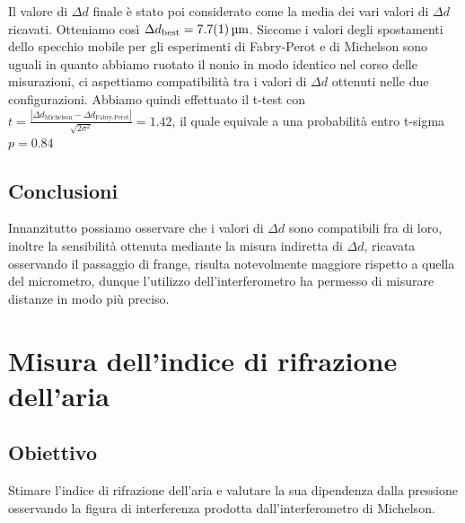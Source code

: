 \documentclass[a4paper]{article}
\begin{document}
Il valore di $\Delta d$ finale è stato poi considerato come la media dei vari valori di $\Delta d$ ricavati. Otteniamo così $\Delta d_{\text{best}}=\SI{7.7 \pm 0.1}{\micro\meter}$.
Siccome i valori degli spostamenti dello specchio mobile per gli esperimenti di Fabry-Perot e di Michelson sono uguali in quanto abbiamo ruotato il nonio in modo identico nel corso delle misurazioni, ci aspettiamo compatibilità tra i valori di $\Delta d$ ottenuti nelle due configurazioni. Abbiamo quindi effettuato il t-test con $t=\frac{|\Delta d_{\text{Michelson}}-\Delta d_{\text{Fabry-Perot}}|}{\sqrt{2\sigma^2}}=\num{1.42}$, il quale equivale a una probabilità entro t-sigma $p=\num{0.84}$
\subsection{Conclusioni}
Innanzitutto possiamo osservare che i valori di $\Delta d$ sono compatibili fra di loro, inoltre la sensibilità ottenuta mediante la misura indiretta di $\Delta d$, ricavata osservando il passaggio di frange, risulta notevolmente maggiore rispetto a quella del micrometro, dunque l'utilizzo dell'interferometro ha permesso di misurare distanze in modo più preciso.

\section{Misura dell'indice di rifrazione dell'aria}
\subsection{Obiettivo}
Stimare l'indice di rifrazione dell'aria e valutare la sua dipendenza dalla pressione osservando la figura di interferenza prodotta dall'interferometro di Michelson.
\end{document}
